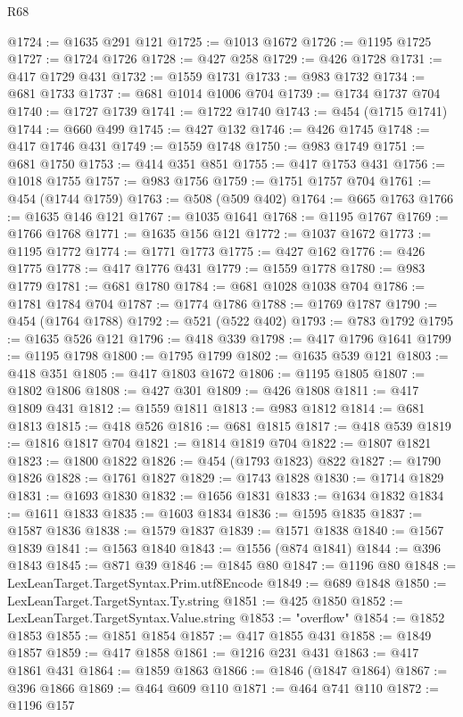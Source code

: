 \begin{lexlean}{R68}
\begin{coremodule}
@1724 := @1635 @291 @121
@1725 := @1013 @1672
@1726 := @1195 @1725
@1727 := @1724 @1726
@1728 := @427 @258
@1729 := @426 @1728
@1731 := @417 @1729 @431
@1732 := @1559 @1731
@1733 := @983 @1732
@1734 := @681 @1733
@1737 := @681 @1014 @1006 @704
@1739 := @1734 @1737 @704
@1740 := @1727 @1739
@1741 := @1722 @1740
@1743 := @454 (@1715 @1741)
@1744 := @660 @499
@1745 := @427 @132
@1746 := @426 @1745
@1748 := @417 @1746 @431
@1749 := @1559 @1748
@1750 := @983 @1749
@1751 := @681 @1750
@1753 := @414 @351 @851
@1755 := @417 @1753 @431
@1756 := @1018 @1755
@1757 := @983 @1756
@1759 := @1751 @1757 @704
@1761 := @454 (@1744 @1759)
@1763 := @508 (@509 @402)
@1764 := @665 @1763
@1766 := @1635 @146 @121
@1767 := @1035 @1641
@1768 := @1195 @1767
@1769 := @1766 @1768
@1771 := @1635 @156 @121
@1772 := @1037 @1672
@1773 := @1195 @1772
@1774 := @1771 @1773
@1775 := @427 @162
@1776 := @426 @1775
@1778 := @417 @1776 @431
@1779 := @1559 @1778
@1780 := @983 @1779
@1781 := @681 @1780
@1784 := @681 @1028 @1038 @704
@1786 := @1781 @1784 @704
@1787 := @1774 @1786
@1788 := @1769 @1787
@1790 := @454 (@1764 @1788)
@1792 := @521 (@522 @402)
@1793 := @783 @1792
@1795 := @1635 @526 @121
@1796 := @418 @339
@1798 := @417 @1796 @1641
@1799 := @1195 @1798
@1800 := @1795 @1799
@1802 := @1635 @539 @121
@1803 := @418 @351
@1805 := @417 @1803 @1672
@1806 := @1195 @1805
@1807 := @1802 @1806
@1808 := @427 @301
@1809 := @426 @1808
@1811 := @417 @1809 @431
@1812 := @1559 @1811
@1813 := @983 @1812
@1814 := @681 @1813
@1815 := @418 @526
@1816 := @681 @1815
@1817 := @418 @539
@1819 := @1816 @1817 @704
@1821 := @1814 @1819 @704
@1822 := @1807 @1821
@1823 := @1800 @1822
@1826 := @454 (@1793 @1823) @822
@1827 := @1790 @1826
@1828 := @1761 @1827
@1829 := @1743 @1828
@1830 := @1714 @1829
@1831 := @1693 @1830
@1832 := @1656 @1831
@1833 := @1634 @1832
@1834 := @1611 @1833
@1835 := @1603 @1834
@1836 := @1595 @1835
@1837 := @1587 @1836
@1838 := @1579 @1837
@1839 := @1571 @1838
@1840 := @1567 @1839
@1841 := @1563 @1840
@1843 := @1556 (@874 @1841)
@1844 := @396 @1843
@1845 := @871 @39
@1846 := @1845 @80
@1847 := @1196 @80
@1848 := LexLeanTarget.TargetSyntax.Prim.utf8Encode
@1849 := @689 @1848
@1850 := LexLeanTarget.TargetSyntax.Ty.string
@1851 := @425 @1850
@1852 := LexLeanTarget.TargetSyntax.Value.string
@1853 := "overflow"
@1854 := @1852 @1853
@1855 := @1851 @1854
@1857 := @417 @1855 @431
@1858 := @1849 @1857
@1859 := @417 @1858
@1861 := @1216 @231 @431
@1863 := @417 @1861 @431
@1864 := @1859 @1863
@1866 := @1846 (@1847 @1864)
@1867 := @396 @1866
@1869 := @464 @609 @110
@1871 := @464 @741 @110
@1872 := @1196 @157

\end{coremodule}
\end{lexlean}
